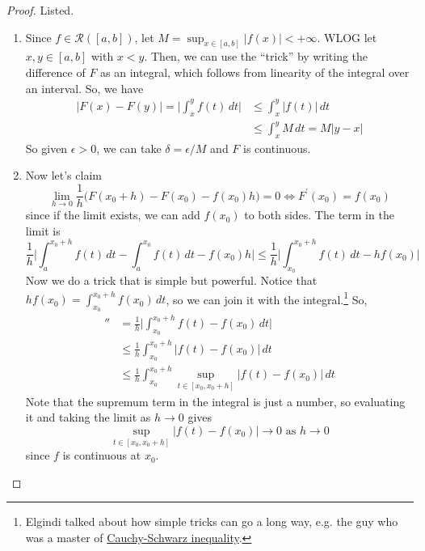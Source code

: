   \begin{proof} 
    Listed. 
    \begin{enumerate}
      \item Since $f \in \mathcal{R}([a, b])$, let $M = \sup_{x \in [a, b]} |f(x)| < + \infty$. WLOG let $x, y \in [a, b]$ with $x < y$. Then, we can use the ``trick'' by writing the difference of $F$ as an integral, which follows from linearity of the integral over an interval. So, we have 
      \begin{align}
        |F(x) - F(y)| = \bigg| \int_x^y f(t) \, dt \bigg| & \leq \int_x^y |f(t)| \,dt \\
                                                          & \leq \int_x^y M \,dt  = M |y - x|
      \end{align}
      So given $\epsilon > 0$, we can take $\delta = \epsilon/M$ and $F$ is continuous. 

      \item Now let's claim 
        \begin{equation}
          \lim_{h \to 0} \frac{1}{h} \big( F(x_0 + h) - F(x_0) - f(x_0) h \big) = 0 \iff F^\prime (x_0) = f(x_0)
        \end{equation} 
        since if the limit exists, we can add $f(x_0)$ to both sides. The term in the limit is 
        \begin{equation}
          \frac{1}{h} \bigg| \int_a^{x_0 + h} f(t) \,dt - \int_a^{x_0} f(t) \,dt - f(x_0) h \bigg| \leq \frac{1}{h} \bigg| \int_{x_0}^{x_0 + h} f(t) \,dt - h f(x_0) \bigg|
        \end{equation}
        Now we do a trick that is simple but powerful. Notice that $h f(x_0) = \int_{x_0}^{x_0 + h} f(x_0) \,dt$, so we can join it with the integral.\footnote{Elgindi talked about how simple tricks can go a long way, e.g. the guy who was a master of \hyperref[lin-thm:cauchy-schwarz-inequality]{Cauchy-Schwarz inequality}.} So, 
        \begin{align}
          '' & = \frac{1}{h} \bigg| \int_{x_0}^{x_0 + h} f(t) - f(x_0) \,dt \bigg| \\ 
             & \leq \frac{1}{h} \int_{x_0}^{x_0 + h} \big| f(t) - f(x_0) \big| \,dt \\ 
             & \leq \frac{1}{h} \int_{x_0}^{x_0 + h} \sup_{t \in [x_0, x_0 + h]} \big| f(t) - f(x_0) \big| \,dt 
        \end{align} 
        Note that the supremum term in the integral is just a number, so evaluating it and taking the limit as $h \to 0$ gives 
        \begin{equation}
          \sup_{t \in [x_0, x_0 + h]} |f(t) - f(x_0)| \to 0 \text{ as } h \to 0
        \end{equation}
        since $f$ is continuous at $x_0$. 
    \end{enumerate}
  \end{proof}

